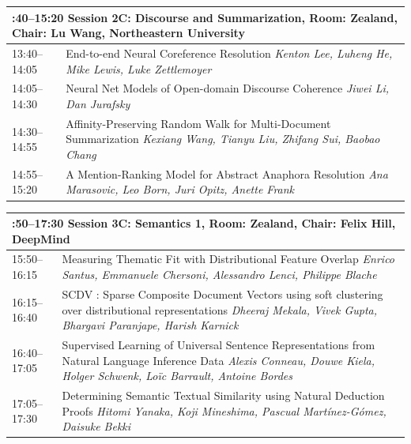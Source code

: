 \documentclass{book}
\renewcommand{\large}{\fontsize{72}{80}\selectfont}
\renewcommand{\large}{\fontsize{82}{90}\selectfont}
\begin{document}
\begin{tabular}{p{20cm}p{70cm}}
  \multicolumn{2}{p{\textwidth}}{\bfseries\large 13:40--15:20 Session 2C: Discourse and Summarization, Room:  Zealand, Chair:  Lu Wang, Northeastern University} \\\hline

    
    13:40--14:05
    &	End-to-end Neural Coreference Resolution \newline 
    {\itshape Kenton Lee, Luheng He, Mike Lewis, Luke Zettlemoyer} \\
    
    14:05--14:30
    &	Neural Net Models of Open-domain Discourse Coherence \newline 
    {\itshape Jiwei Li, Dan Jurafsky} \\
    
    14:30--14:55
    &	Affinity-Preserving Random Walk for Multi-Document Summarization \newline 
    {\itshape Kexiang Wang, Tianyu Liu, Zhifang Sui, Baobao Chang} \\
    
    14:55--15:20
    &	A Mention-Ranking Model for Abstract Anaphora Resolution \newline 
    {\itshape Ana Marasovic, Leo Born, Juri Opitz, Anette Frank} \\
    
\end{tabular}
\vspace*{\fill}

\begin{tabular}{p{20cm}p{70cm}}
  \multicolumn{2}{p{\textwidth}}{\bfseries\large 15:50--17:30 Session 3C: Semantics 1, Room:  Zealand, Chair:  Felix Hill, DeepMind} \\\hline

    
    15:50--16:15
    &	Measuring Thematic Fit with Distributional Feature Overlap \newline 
    {\itshape Enrico Santus, Emmanuele Chersoni, Alessandro Lenci, Philippe Blache} \\
    
    16:15--16:40
    &	SCDV : Sparse Composite Document Vectors using soft clustering over distributional representations \newline 
    {\itshape Dheeraj Mekala, Vivek Gupta, Bhargavi Paranjape, Harish Karnick} \\
    
    16:40--17:05
    &	Supervised Learning of Universal Sentence Representations from Natural Language Inference Data \newline 
    {\itshape Alexis Conneau, Douwe Kiela, Holger Schwenk, Loïc Barrault, Antoine Bordes} \\
    
    17:05--17:30
    &	Determining Semantic Textual Similarity using Natural Deduction Proofs \newline 
    {\itshape Hitomi Yanaka, Koji Mineshima, Pascual Martínez-Gómez, Daisuke Bekki} \\
    
\end{tabular}
\vspace*{\fill}
\end{document}
